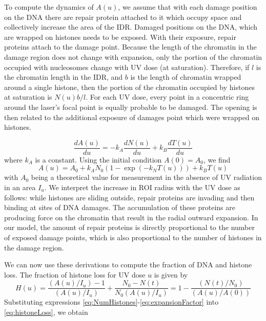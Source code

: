 \documentclass[12pt]{article}
\begin{document}
To compute the dynamics of $A(u)$, we assume that with each damage position on the DNA there are repair protein attached to it which occupy space and collectively increase the area of the IDR. Damaged positions on the DNA, which are wrapped on histones needs to be exposed. With their exposure, repair proteins attach to the damage point. Because the length of the chromatin in the damage region does not change with expansion, only the portion of the chromatin occupied with nucleosomes change with UV dose (at saturation). Therefore, if $l$ is the chromatin length in the IDR, and $b$ is the length of chromatin wrapped around a single histone, then the portion of the chromatin occupied by histones at saturation is $N(u)b/l$. For each UV dose, every point in a concentric ring around the laser's focal point is equally probable to be damaged. The opening is then related to the additional exposure of damages point which were wrapped on histones. 

\begin{equation}\label{dralpha}
\frac{dA(u)}{du}=-k_A\frac{dN(u)}{du}+k_B\frac{dT(u)}{du}
\end{equation}
where $k_A$ is a constant. Using the initial condition $A(0)=A_0$, we find 
\begin{equation}\label{eq:expansionFactor}
A(u) = A_0 +k_AN_0\left(1-\exp\left(-k_NT(u)\right)\right) +k_BT(u)
\end{equation}
with $A_0$ being a theoretical value for measurement in the absence of UV radiation in an area $I_u$. We interpret the increase in ROI radius with the UV dose as follows: while histones are sliding outside, repair proteins are invading and then binding at sites of DNA damages. The accumulation of these proteins are producing force on the chromatin that result in the radial outward expansion. In our model, the amount of repair proteins is directly proportional to the number of exposed damage points, which is also proportional to the number of histones in the damage region.

We can now use these derivations to compute the fraction of DNA and histone loss. The fraction of histone loss for UV dose $u$ is given by
\begin{equation}\label{eq:histoneLoss}
H(u) = \frac{(A(u)/I_u)-1}{(A(u)/I_u)} +\frac{N_0-N(t)}{N_0(A(u)/I_u)}=1-\frac{(N(t)/N_0)}{(A(u)/A(0))}
\end{equation}
Substituting expressions \ref{eq:NumHistones}-\ref{eq:expansionFactor} into \ref{eq:histoneLoss}, we obtain
\end{document}
